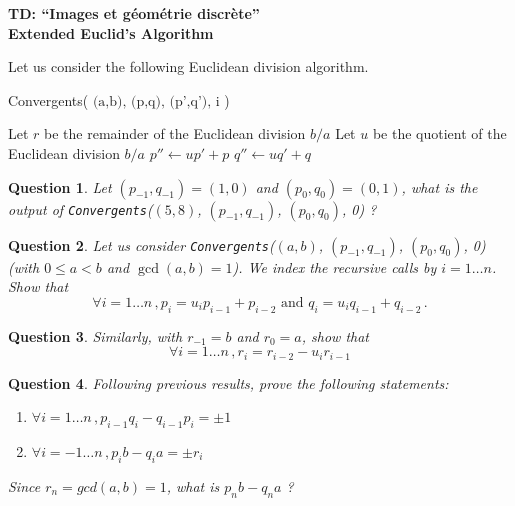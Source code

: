 \documentclass[a4paper, 11pt]{article}
\title{}
\author{}
\date{}
\newtheorem{qu}{Question}
\begin{document}
\begin{center}
	\LARGE \textbf{TD: ``Images et g\'eom\'etrie discr\`ete''\\Extended Euclid's Algorithm}
\end{center}


Let us consider the following Euclidean division algorithm.

\begin{procedure}[H]
\caption{Convergents( $\text{(a,b), (p,q), (p',q'), i}$ )}
\label{algo:conv}
%
Let $r$ be the remainder of the Euclidean division $b/a$\;
Let $u$ be the quotient  of the Euclidean division $b/a$\;
$p'' \leftarrow up' + p$\; $q'' \leftarrow uq' + q$\;
\end{procedure}


\begin{qu}
\label{qu:init}
  Let $(p_{-1},q_{-1})=(1,0)$ and $(p_0,q_0)=(0,1)$, what is the
  output of \emph{\texttt{Convergents}}($(5,8)$, $(p_{-1},q_{-1})$,
  $(p_0,q_0)$, 0) ?
\end{qu}


\begin{qu}
  Let us consider \emph{\texttt{Convergents}}($(a,b)$, $(p_{-1},q_{-1})$,
  $(p_0,q_0)$, 0) (with $0 \leq a < b$ and $\gcd{(a,b)} = 1$). We
  index the recursive calls by $i=1\ldots n$. Show that
  \begin{displaymath}
    \forall i=1\ldots n\,, p_i=u_ip_{i-1}+p_{i-2}\text{ and } q_i=u_iq_{i-1}+q_{i-2}\,.
  \end{displaymath}
\end{qu}


\begin{qu}
Similarly, with $r_{-1}=b$ and $r_0=a$, show that
  \begin{displaymath}
    \forall i=1\ldots n\,, r_i=r_{i-2}- u_ir_{i-1}
  \end{displaymath}
\end{qu}

\begin{qu}
  Following previous results, prove the following statements:

  \begin{enumerate}
  \item $\forall i=1\ldots n\,, p_{i-1}q_i - q_{i-1}p_i = \pm 1$
  \item $\forall i=-1\ldots n\,, p_{i}b - q_{i}a = \pm r_i$
  \end{enumerate}
Since $r_n=gcd(a,b)=1$, what is $p_nb-q_na$ ?
\end{qu}
\end{document}
